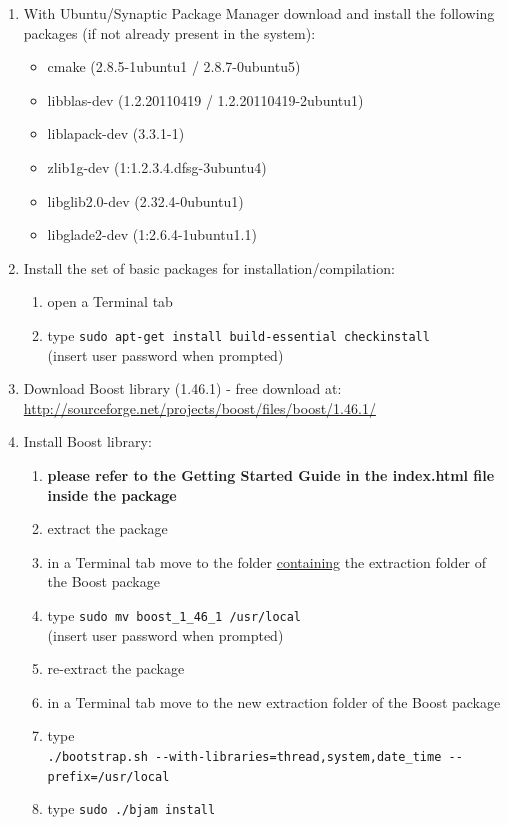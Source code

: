 \documentclass[10pt,a4paper]{report}
\begin{document}
\begin{enumerate}
\item With Ubuntu/Synaptic Package Manager download and install the following packages (if not already present in the system):
\begin{itemize}
\item cmake (2.8.5-1ubuntu1 / 2.8.7-0ubuntu5)
\item libblas-dev (1.2.20110419 / 1.2.20110419-2ubuntu1)
\item liblapack-dev (3.3.1-1)
\item zlib1g-dev (1:1.2.3.4.dfsg-3ubuntu4)
\item libglib2.0-dev (2.32.4-0ubuntu1)
\item libglade2-dev (1:2.6.4-1ubuntu1.1)
\end{itemize}
\item Install the set of basic packages for installation/compilation:
\begin{enumerate}
\item open a Terminal tab
\item type \verb+sudo apt-get install build-essential checkinstall+\\
(insert user password when prompted)
\end{enumerate}
\item Download Boost library (1.46.1) - free download at:\\ \url{http://sourceforge.net/projects/boost/files/boost/1.46.1/}
\item Install Boost library:
\begin{enumerate}
\item \textbf{please refer to the Getting Started Guide in the index.html file inside the package}
\item extract the package
\item in a Terminal tab move to the folder \underline{containing} the extraction folder of the Boost package
\item type \verb+sudo mv boost_1_46_1 /usr/local+\\
(insert user password when prompted)
\item re-extract the package
\item in a Terminal tab move to the new extraction folder of the Boost package
\item type\\
\verb+./bootstrap.sh --with-libraries=thread,system,date_time --prefix=/usr/local+
\item type \verb+sudo ./bjam install+\\

\end{enumerate}
\end{enumerate}
\end{document}
